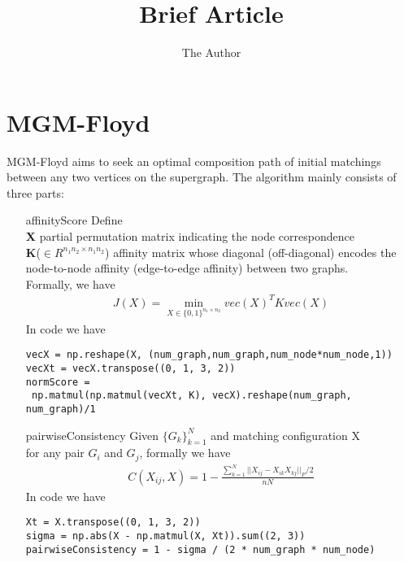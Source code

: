 \documentclass[11pt, oneside]{article}   	%
\title{Brief Article}
\author{The Author}
\begin{document}
\maketitle
\section{MGM-Floyd}
MGM-Floyd aims to seek an optimal composition path of initial matchings between any two vertices on the supergraph. The algorithm mainly consists of three parts:
\begin{itemize}
\item[affinityScore] Define\\
 \textbf{X} partial permutation matrix indicating the node correspondence\\
 \textbf{K}($\in R^{n_1n_2\times n_1n_2}$) affinity matrix whose diagonal (off-diagonal) encodes the node-to-node affinity (edge-to-edge affinity) between two graphs.\\
 Formally, we have 
 \begin{align} %
    J(X) = \min\limits_{X\in \{0,1\}^{n_1\times n_2}} vec(X)^TKvec(X)
 \end{align}
In code we have
\begin{lstlisting}[language={[ANSI]C},keywordstyle=\color{blue!70},commentstyle=\color{red!50!green!50!blue!50},frame=shadowbox, rulesepcolor=\color{red!20!green!20!blue!20}] 
vecX = np.reshape(X, (num_graph,num_graph,num_node*num_node,1))
vecXt = vecX.transpose((0, 1, 3, 2))
normScore =
 np.matmul(np.matmul(vecXt, K), vecX).reshape(num_graph, num_graph)/1
\end{lstlisting}

\item[pairwiseConsistency]  Given $\{G_k\}^N_{k=1}$ and matching configuration X\\
 for any pair $G_i$ and $G_j$, formally we have
 \begin{align} %
    C(X_{ij},X) = 1 - \frac{\sum_{k=1}^N||X_{ij}-X_{ik}X_{kj}||_F/2}{nN}
 \end{align} 
In code we have
\begin{lstlisting}[language={[ANSI]C},keywordstyle=\color{blue!70},commentstyle=\color{red!50!green!50!blue!50},frame=shadowbox, rulesepcolor=\color{red!20!green!20!blue!20}] 
Xt = X.transpose((0, 1, 3, 2))
sigma = np.abs(X - np.matmul(X, Xt)).sum((2, 3))
pairwiseConsistency = 1 - sigma / (2 * num_graph * num_node)
\end{lstlisting}


\end{itemize}
\end{document}
